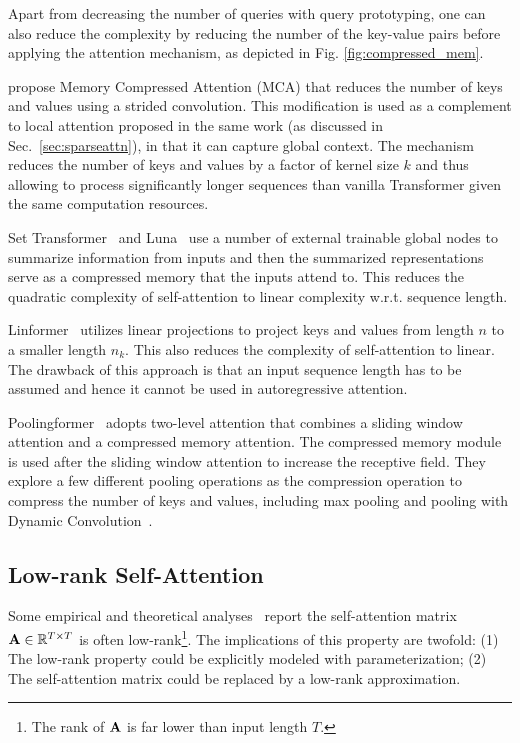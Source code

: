 \documentclass[manuscript,acmsmall,screen,nonacm]{acmart}
\theoremstyle{definition}
\begin{document}
Apart from decreasing the number of queries with query prototyping, one can also reduce the complexity by reducing the number of the key-value pairs before applying the attention mechanism, as depicted in Fig. \ref{fig:compressed_mem}.

\citet{liu2018generating} propose Memory Compressed Attention (MCA) that reduces the number of keys and values using a strided convolution. This modification is used as a complement to local attention proposed in the same work (as discussed in Sec.~\ref{sec:sparseattn}), in that it can capture global context. The mechanism reduces the number of keys and values by a factor of kernel size $k$ and thus allowing to process significantly longer sequences than vanilla Transformer given the same computation resources.

Set Transformer~\cite{lee2019set} and Luna~\cite{ma2021luna} use a number of external trainable global nodes to summarize information from inputs and then the summarized representations serve as a compressed memory that the inputs attend to. This reduces the quadratic complexity of self-attention to linear complexity w.r.t. sequence length.

Linformer~\cite{wang2020linformer} utilizes linear projections to project keys and values from length $n$ to a smaller length $n_k$. This also reduces the complexity of self-attention to linear. The drawback of this approach is that an input sequence length has to be assumed and hence it cannot be used in autoregressive attention.

Poolingformer~\cite{zhang2021poolingformer} adopts two-level attention that combines a sliding window attention and a compressed memory attention. The compressed memory module is used after the sliding window attention to increase the receptive field. They explore a few different pooling operations as the compression operation to compress the number of keys and values, including max pooling and pooling with Dynamic Convolution~\cite{wu2019paylessattention}.

\subsection{Low-rank Self-Attention}

Some empirical and theoretical analyses~\cite{guo19lowrank,wang2020linformer} report the self-attention matrix $\mathbf{A} \in \mathbb{R}^{T\times T}$ is often low-rank\footnote{The rank of $\mathbf{A}$ is far lower than input length $T$.}. The implications of this property are twofold: (1) The low-rank property could be explicitly modeled with parameterization; (2) The self-attention matrix could be replaced by a low-rank approximation.
\end{document}
